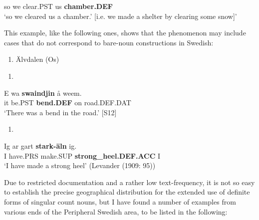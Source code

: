 so  we  clear.PST  us  \textbf{chamber.DEF}\\ %


‘so we cleared us a chamber.’ [i.e. we made a shelter by clearing some snow]’
\z


This example, like the following ones, shows that the phenomenon may include cases that do not correspond to bare-noun constructions in Swedish: 

\begin{enumerate} %
\item 
Älvdalen (Os)

\end{enumerate} %
\setcounter{listLFOxcviiileveli}{0}
\begin{enumerate} %
\item 
\end{enumerate} %
\ea\label{}
\gll E  wa  \textbf{swaindjin} å  weem.\\


it  be.PST  \textbf{bend.DEF} on  road.DEF.DAT\\ %


‘There was a bend in the road.’ [S12]
\z

\begin{enumerate} %
\item 
\end{enumerate} %
\ea\label{}
\gll Ig  ar  gart  \textbf{stark-äln} ig.\\


I   have.PRS  make.SUP  \textbf{strong\_heel.DEF.ACC} I\\ %


‘I have made a strong heel’ (Levander (1909: 95))
\z

Due to restricted documentation and a rather low text-frequency, it is not so easy to establish the precise geographical distribution for the extended use of definite forms of singular count nouns, but I have found a number of examples from various ends of the Peripheral Swedish area, to be listed in the following: 

